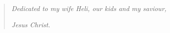 \hspace{0pt}\vfill

\begin{quote}
    \emph{Dedicated to my wife Heli, our kids and my saviour,}
    
    \emph{Jesus Christ.}
\end{quote}

\vfill\hspace{0pt}